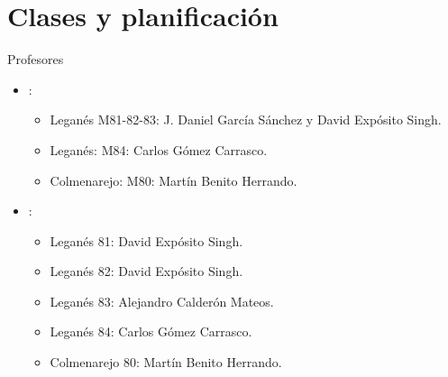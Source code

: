 \section{Clases y planificación}

\begin{frame}[t]{Profesores}
\begin{itemize}
  \item {}: 
    \begin{itemize}
      \item Leganés M81-82-83: J. Daniel García Sánchez y David Expósito Singh.
      \item Leganés: M84: Carlos Gómez Carrasco.
      \item Colmenarejo: M80: Martín Benito Herrando.
    \end{itemize}
  \item {}: 
    \begin{itemize}
      \item Leganés 81: David Expósito Singh.
      \item Leganés 82: David Expósito Singh.
      \item Leganés 83: Alejandro Calderón Mateos.
      \item Leganés 84: Carlos Gómez Carrasco.
      \item Colmenarejo 80: Martín Benito Herrando.
    \end{itemize}
\end{itemize}
\end{frame}

